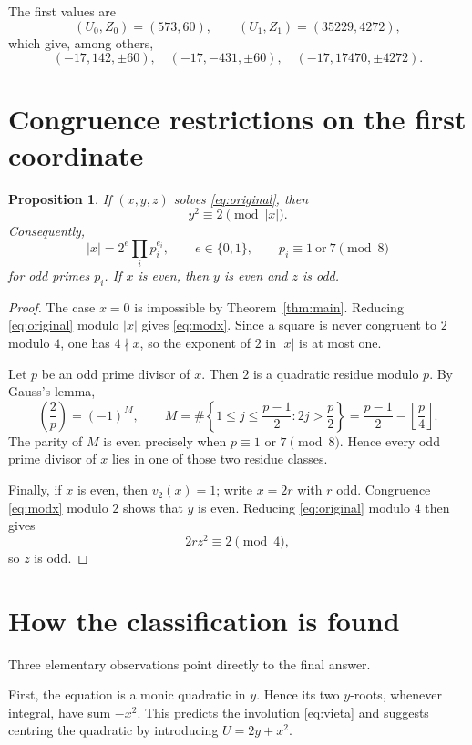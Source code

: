 \documentclass[11pt]{article}
\newtheorem{proposition}[theorem]{Proposition}
\theoremstyle{remark}
\begin{document}
The first values are
\[
 (U_0,Z_0)=(573,60),\qquad
 (U_1,Z_1)=(35229,4272),
\]
which give, among others,
\[
 (-17,142,\pm60),\quad (-17,-431,\pm60),
 \quad (-17,17470,\pm4272).
\]

\section{Congruence restrictions on the first coordinate}

\begin{proposition}\label{prop:congruences}
If $(x,y,z)$ solves \eqref{eq:original}, then
\begin{equation}\label{eq:modx}
 y^2\equiv2\pmod{|x|}.
\end{equation}
Consequently,
\[
 |x|=2^e\prod_i p_i^{e_i},
 \qquad e\in\{0,1\},
 \qquad p_i\equiv1\ \text{or}\ 7\pmod8
\]
for odd primes $p_i$.  If $x$ is even, then $y$ is even and $z$ is odd.
\end{proposition}

\begin{proof}
The case $x=0$ is impossible by Theorem~\ref{thm:main}.  Reducing \eqref{eq:original} modulo $|x|$ gives \eqref{eq:modx}.  Since a square is never congruent to $2$ modulo $4$, one has $4\nmid x$, so the exponent of $2$ in $|x|$ is at most one.

Let $p$ be an odd prime divisor of $x$.  Then $2$ is a quadratic residue modulo $p$.  By Gauss's lemma,
\[
 \left(\frac2p\right)=(-1)^M,
 \qquad
 M=\#\left\{1\le j\le\frac{p-1}{2}:2j>\frac p2\right\}
 =\frac{p-1}{2}-\left\lfloor\frac p4\right\rfloor.
\]
The parity of $M$ is even precisely when $p\equiv1$ or $7\pmod8$.  Hence every odd prime divisor of $x$ lies in one of those two residue classes.

Finally, if $x$ is even, then $v_2(x)=1$; write $x=2r$ with $r$ odd.  Congruence \eqref{eq:modx} modulo $2$ shows that $y$ is even.  Reducing \eqref{eq:original} modulo $4$ then gives
\[
 2rz^2\equiv2\pmod4,
\]
so $z$ is odd.
\end{proof}

\section{How the classification is found}

Three elementary observations point directly to the final answer.

First, the equation is a monic quadratic in $y$.  Hence its two $y$-roots, whenever integral, have sum $-x^2$.  This predicts the involution \eqref{eq:vieta} and suggests centring the quadratic by introducing $U=2y+x^2$.
\end{document}
